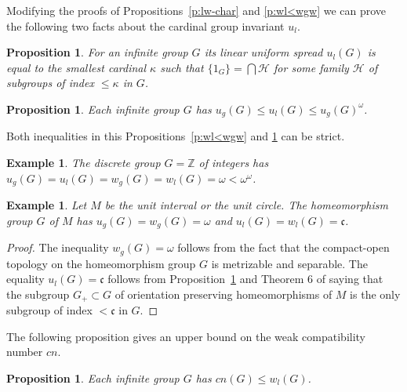 \documentclass[11pt, twoside]{amsart}
\newtheorem{proposition}[theorem]{Proposition}
\newtheorem{example}[theorem]{Example}
\theoremstyle{definition}
\begin{document}
Modifying the proofs of Propositions~\ref{p:lw-char} and \ref{p:wl<wgw} we can prove the following two facts about the cardinal group invariant $u_l$.

\begin{proposition}\label{p:ul-char} For an infinite group $G$ its linear uniform spread $u_l(G)$ is equal to the smallest cardinal $\kappa$ such that $\{1_G\}=\bigcap\mathcal H$ for some family $\mathcal H$ of subgroups of index $\le \kappa$ in $G$.
\end{proposition}

\begin{proposition}\label{p:ul<ugw} Each infinite group $G$ has $u_g(G)\le u_l(G)\le u_g(G)^{\omega}$.
\end{proposition}

Both inequalities in this Propositions~\ref{p:wl<wgw} and \ref{p:ul<ugw} can be strict.

\begin{example} The discrete group $G=\mathbb Z$ of integers has $u_g(G)=u_l(G)=w_g(G)=w_l(G)={\omega}<{\omega}^{\omega}$.
\end{example}

\begin{example} Let $M$ be the unit interval or the unit circle. The homeomorphism group $G$ of $M$ has
$u_g(G)=w_g(G)={\omega}$ and $u_l(G)=w_l(G)=\mathfrak c$.
\end{example}

\begin{proof} The inequality $w_g(G)={\omega}$ follows from the fact that the compact-open topology on the homeomorphism group $G$ is metrizable and separable. The equality $u_l(G)=\mathfrak c$ follows from Proposition~\ref{p:ul-char} and Theorem 6 of \cite{RS} saying that the subgroup $G_+\subset G$ of orientation preserving homeomorphisms of $M$ is the only subgroup of index $<\mathfrak c$ in $G$.
\end{proof}

The following proposition gives an upper bound on the weak compatibility number ${cn}$.

\begin{proposition}\label{p:wc<lw} Each infinite group $G$ has ${cn}(G)\le w_l(G)$.
\end{proposition}
\end{document}
